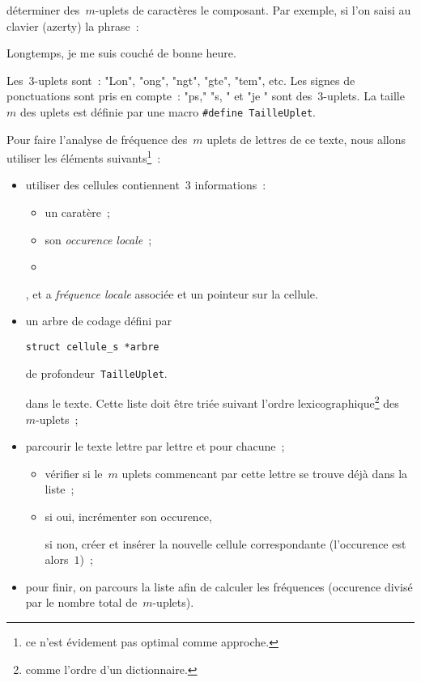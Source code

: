 

d\'eterminer des~$m$-uplets de
caract\`eres le composant.  Par exemple, si l'on saisi au clavier
(azerty) la phrase~:
\par
\centerline{Longtemps, je me suis couch\'e de bonne heure.}
\par
Les~$3$-uplets sont~: "Lon", "ong", "ngt", "gte", "tem", etc. Les
signes de ponctuations sont pris en compte~: "ps," "s, " et "je " sont
des~$3$-uplets. La taille~$m$ des uplets est d\'efinie par une macro
\verb+#define TailleUplet+.
\par
Pour faire l'analyse de fr\'equence des~$m$ uplets de lettres de ce
texte, nous allons utiliser les \'el\'ements suivants\footnote{ce
  n'est \'evidement pas optimal comme approche.}~:
\begin{itemize}
\item utiliser des cellules contiennent~$3$ informations~:
  \begin{itemize}
  \item un  carat\`ere~;
  \item son \emph{occurence locale}~;
  \item 
  \end{itemize}
,  et a \emph{fr\'equence
    locale} associ\'ee et un pointeur sur la cellule.
\item un arbre de codage d\'efini par
\begin{verbatim}
struct cellule_s *arbre
\end{verbatim}
 de profondeur~\verb+TailleUplet+.


 dans le texte. Cette liste doit \^etre tri\'ee
  suivant l'ordre lexicographique\footnote{comme l'ordre d'un
    dictionnaire.} des~$m$-uplets~;
\item parcourir le texte lettre par lettre et pour chacune~;
  \begin{itemize}
  \item v\'erifier si le~$m$ uplets commencant par cette lettre se
    trouve d\'ej\`a dans la liste~;
  \item si oui, incr\'ementer son occurence,
    \par
    si non, cr\'eer et ins\'erer la nouvelle cellule correspondante
    (l'occurence est alors~$1$)~;
  \end{itemize}
\item pour finir, on parcours la liste afin de calculer les
  fr\'equences (occurence divis\'e par le nombre total de~$m$-uplets).
\end{itemize}
\par\medskip

